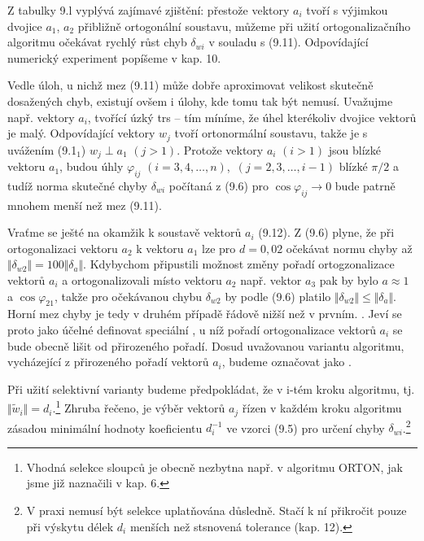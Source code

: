 \noindent
Z tabulky 9.l  vyplývá zajímavé zjištění: přestože vektory
$a_i$ tvoří s výjimkou dvojice $a_1$, $a_2$ přibližně ortogonální
soustavu, můžeme při užití ortogonalizačního algoritmu očekávat rychlý
růst chyb $\delta_{wi}$ v souladu s (9.11). Odpovídající numerický
experiment popíšeme v kap. 10.


Vedle úloh, u nichž mez (9.11) může dobře aproximovat velikost
skutečně dosažených chyb, existují ovšem i úlohy, kde tomu tak být
nemusí. Uvažujme např. vektory $a_i$, tvořící úzký trs -- tím míníme,
že úhel kterékoliv dvojice vektorů je malý.  Odpovídající vektory
$w_j$ tvoří ortonormální soustavu, takže je s uvážením (9.1$_1$)
$w_j \perp a_1$ $(j > 1)$. Protože vektory $a_i$ $(i> 1)$ jsou blízké
vektoru $a_1$, budou úhly $\varphi_{ij}$ $(i=3,4,\ldots,n)$,
$\,(j=2,3,\ldots,i-1)$ blízké $\pi/2$ a tudíž norma skutečné chyby
$\delta_{wi}$ počítaná z (9.6) pro $\cos \varphi_{ij} \rightarrow 0$
bude patrně mnohem menší než mez (9.11).


Vraťme se ješté na okamžik k soustavě vektorů $a_i$ (9.12). Z (9.6)
plyne, že při ortogonalizaci vektoru $a_2$ k vektoru $a_1$ lze pro
$d=0,02$ očekávat normu chyby až $\Vert \delta_{w2} \Vert =
100 \Vert \delta_a \Vert$.  Kdybychom připustili možnost změny pořadí
ortogzonalizace vektorů $a_i$ a ortogonalizovali místo vektoru $a_2$
např. vektor $a_3$ pak by bylo $a \approx 1$ a $\cos \varphi_{21}$,
takže pro očekávanou chybu $\delta_{w2}$ by podle (9.6) platilo
$\Vert \delta_{w2}\Vert \le \Vert \delta_a \Vert$.  Horní mez chyby je
tedy v druhém případě řádově nižší než v prvním.
.  Jeví se proto jako účelné
definovat speciální , u níž pořadí ortogonalizace vektorů $a_i$ se bude obecně
lišit od přirozeného pořadí.  Dosud uvažovanou variantu algoritmu,
vycházející z přirozeného pořadí vektorů $a_i$, budeme označovat
jako .


Při užití selektivní varianty budeme předpokládat, že v i-tém kroku
algoritmu, tj.  $\Vert \widetilde w_i \Vert = d_i$.\footnote{Vhodná
selekce sloupců je obecně nezbytna např. v algoritmu ORTON, jak jsme
již naznačili v kap. 6.}
%
Zhruba řečeno,  je výběr vektorů $a_j$ řízen v každém kroku
algoritmu zásadou minimální hodnoty koeficientu $d_i^{-1}$ ve vzorci
(9.5) pro určení chyby $\delta_{wi}$.\footnote{V praxi nemusí být
selekce uplatňována důsledně. Stačí k ní přikročit pouze při výskytu
délek $d_i$ menších než stsnovená tolerance (kap. 12).}


